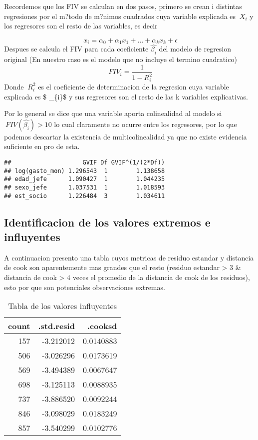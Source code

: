 \documentclass[]{book}
\begin{document}
Recordemos que los FIV se calculan en dos pasos, primero se crean i
distintas regresiones por el m?todo de m?nimos cuadrados cuya variable
explicada es \(\ X_{i}\) y los regresores son el resto de las variables,
es decir

\[ \ x_{i} = \alpha_{0} + \alpha_{1}x_{1} + \dots + \alpha_{k}x_{k} + \epsilon \]
Despues se calcula el FIV para cada coeficiente \(\hat{\beta_{i}}\) del
modelo de regresion original (En nuestro caso es el modelo que no
incluye el termino cuadratico) \[ \ FIV_{i} = \frac{1}{1-R^{2}_{i}} \]
Donde \(\ R_{i}^{2}\) es el coeficiente de determinacion de la regresion
cuya variable explicada es \$ \x\_\{i\}\$ y sus regresores son el resto
de las k variables explicativas.

Por lo general se dice que una variable aporta colinealidad al modelo si
\(\ FIV(\hat{\beta_{i}}) > 10\) lo cual claramente no ocurre entre los
regresores, por lo que podemos descartar la existencia de
multicolinealidad ya que no existe evidencia suficiente en pro de esta.

\begin{verbatim}
##                    GVIF Df GVIF^(1/(2*Df))
## log(gasto_mon) 1.296543  1        1.138658
## edad_jefe      1.090427  1        1.044235
## sexo_jefe      1.037531  1        1.018593
## est_socio      1.226484  3        1.034611
\end{verbatim}

\subsection{Identificacion de los valores extremos e
influyentes}\label{identificacion-de-los-valores-extremos-e-influyentes}

A continuacion presento una tabla cuyos metricas de residuo estandar y
distancia de cook son aparentemente mas grandes que el resto (residuo
estandar \textgreater{} 3 \& distancia de cook \textgreater{} 4 veces el
promedio de la distancia de cook de los residuos), esto por que son
potenciales observaciones extremas.

\begin{table}

\caption{\label{tab:unnamed-chunk-44}Tabla de los valores influyentes}
\centering
\begin{tabular}[t]{r|r|r}
\hline
count & .std.resid & .cooksd\\
\hline
157 & -3.212012 & 0.0140883\\
\hline
506 & -3.026296 & 0.0173619\\
\hline
569 & -3.494389 & 0.0067647\\
\hline
698 & -3.125113 & 0.0088935\\
\hline
737 & -3.886520 & 0.0092244\\
\hline
846 & -3.098029 & 0.0183249\\
\hline
857 & -3.540299 & 0.0102776\\
\hline
\end{tabular}
\end{table}
\end{document}
